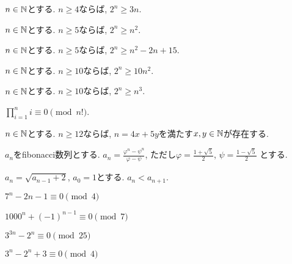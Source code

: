 \begin{prop}
$n\in\mathbb{N}$とする.
  $n\geq 4$ならば, $2^n\geq 3n$.
\end{prop}


\begin{prop}
$n\in\mathbb{N}$とする.
  $n\geq 5$ならば, $2^n\geq n^2$.
\end{prop}

\begin{prop}
$n\in\mathbb{N}$とする.
  $n\geq 5$ならば, $2^n\geq n^2-2n+15$.
\end{prop}


\begin{prop}
$n\in\mathbb{N}$とする.
  $n\geq 10$ならば, $2^n\geq 10n^2$.
\end{prop}

\begin{prop}
$n\in\mathbb{N}$とする.
  $n\geq 10$ならば, $2^n\geq n^3$.
\end{prop}

\begin{prop}
$\prod_{i=1}^n i \equiv 0 \pmod{n!}$.
\end{prop}



\begin{prop}
$n\in\mathbb{N}$とする.
  $n\geq 12$ならば, $n=4x+5y$を満たす$x,y\in\mathbb{N}$が存在する.
\end{prop}


\begin{prop}
  $a_n$をfibonacci数列とする.
  $a_n=\frac{\varphi^n-\psi^n}{\varphi-\psi}$,
  ただし$\varphi=\frac{1+\sqrt{5}}{2}$,
  $\psi=\frac{1-\sqrt{5}}{2}$
  とする.
\end{prop}

\begin{prop}
  $a_n=\sqrt{a_{n-1}+2}$, $a_0=1$とする.
  $a_n<a_{n+1}$.
\end{prop}


\begin{prop}
  $7^n-2n-1\equiv 0\pmod{4}$
\end{prop}

\begin{prop}
  $1000^n+(-1)^{n-1}\equiv 0\pmod{7}$
\end{prop}

\begin{prop}
  $3^{3n}-2^n\equiv 0\pmod{25}$
\end{prop}

\begin{prop}
  $3^{n}-2^n+3\equiv 0\pmod{4}$
\end{prop}

